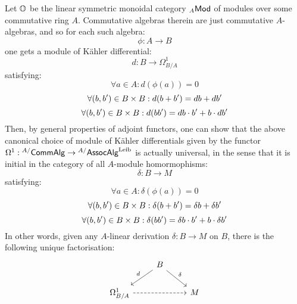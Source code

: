                 \begin{corollary} \label{coro: kahler_differential_universal_property}
                    Let $\mathbb{O}$ be the linear symmetric monoidal category ${}_A\mathsf{Mod}$ of modules over some commutative ring $A$. Commutative algebras therein are just commutative $A$-algebras, and so for each such algebra:
                        $$\phi: A \to B$$
                    one gets a module of K\"ahler differential:
                        $$d: B \to \Omega^1_{B/A}$$
                    satisfying:
                        $$\forall a \in A: d\left(\phi(a)\right) = 0$$
                        $$\forall (b, b') \in B \x B: d(b + b') = db + db'$$
                        $$\forall (b, b') \in B \x B: d(bb') = db \cdot b' + b \cdot db'$$
                    Then, by general properties of adjoint functors, one can show that the above canonical choice of module of K\"ahler differentials given by the functor $\Omega^1: {}^{A/}\mathsf{Comm}\mathsf{Alg} \to {}^{A/}\mathsf{Assoc}\mathsf{Alg}^{\mathrm{Leib}}$ is actually universal, in the sense that it is initial in the category of all $A$-module homormophisms:
                        $$\delta: B \to M$$
                    satisfying:
                        $$\forall a \in A: \delta\left(\phi(a)\right) = 0$$
                        $$\forall (b, b') \in B \x B: \delta(b + b') = \delta b + \delta b'$$
                        $$\forall (b, b') \in B \x B: \delta(bb') = \delta b \cdot b' + b \cdot \delta b'$$
                    In other words, given any $A$-linear derivation $\delta: B \to M$ on $B$, there is the following unique factorisation:
                        $$
                            \begin{tikzcd}
                            	 & B \\
                            	{\Omega^1_{B/A}} && M
                            	\arrow["\delta", from=1-2, to=2-3]
                            	\arrow["d"', from=1-2, to=2-1]
                            	\arrow[dashed, from=2-1, to=2-3]
                            \end{tikzcd}
                        $$
                \end{corollary}
                
